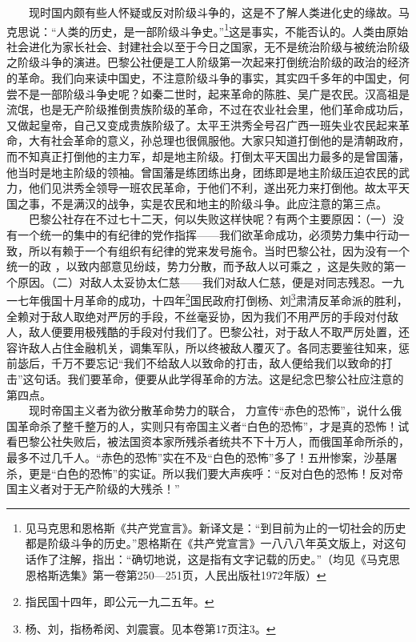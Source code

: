\documentclass[cn,11pt,chinese]{elegantbook}
\begin{document}
　　现时国内颇有些人怀疑或反对阶级斗争的，这是不了解人类进化史的缘故。马克思说：“人类的历史，是一部阶级斗争史。”\footnote[3]{见马克思和恩格斯《共产党宣言》。新译文是：“到目前为止的一切社会的历史都是阶级斗争的历史。”恩格斯在《共产党宣言》一八八八年英文版上，对这句话作了注解，指出：“确切地说，这是指有文字记载的历史。”（均见《马克思恩格斯选集》第一卷第250—251页，人民出版社1972年版）}这是事实，不能否认的。人类由原始社会进化为家长社会、封建社会以至于今日之国家，无不是统治阶级与被统治阶级之阶级斗争的演进。巴黎公社便是工人阶级第一次起来打倒统治阶级的政治的经济的革命。我们向来读中国史，不注意阶级斗争的事实，其实四千多年的中国史，何尝不是一部阶级斗争史呢？如秦二世时，起来革命的陈胜、吴广是农民。汉高祖是流氓，也是无产阶级推倒贵族阶级的革命，不过在农业社会里，他们革命成功后，又做起皇帝，自己又变成贵族阶级了。太平王洪秀全号召广西一班失业农民起来革命，大有社会革命的意义，孙总理也很佩服他。大家只知道打倒他的是清朝政府，而不知真正打倒他的主力军，却是地主阶级。打倒太平天国出力最多的是曾国藩，他当时是地主阶级的领袖。曾国藩是练团练出身，团练即是地主阶级压迫农民的武力，他们见洪秀全领导一班农民革命，于他们不利，遂出死力来打倒他。故太平天国之事，不是满汉的战争，实是农民和地主的阶级斗争。此应注意的第三点。\\
　　巴黎公社存在不过七十二天，何以失败这样快呢？有两个主要原因：（一）没有一个统一的集中的有纪律的党作指挥——我们欲革命成功，必须势力集中行动一致，所以有赖于一个有组织有纪律的党来发号施令。当时巴黎公社，因为没有一个统一的政 ，以致内部意见纷歧，势力分散，而予敌人以可乘之 ，这是失败的第一个原因。（二）对敌人太妥协太仁慈——我们对敌人仁慈，便是对同志残忍。一九一七年俄国十月革命的成功，十四年\footnote[4]{指民国十四年，即公元一九二五年。}国民政府打倒杨、刘\footnote[5]{杨、刘，指杨希闵、刘震寰。见本卷第17页注3。}肃清反革命派的胜利，全赖对于敌人取绝对严厉的手段，不丝毫妥协，因为我们不用严厉的手段对付敌人，敌人便要用极残酷的手段对付我们了。巴黎公社，对于敌人不取严厉处置，还容许敌人占住金融机关，调集军队，所以终被敌人覆灭了。各同志要鉴往知来，惩前毖后，千万不要忘记“我们不给敌人以致命的打击，敌人便给我们以致命的打击”这句话。我们要革命，便要从此学得革命的方法。这是纪念巴黎公社应注意的第四点。\\
　　现时帝国主义者为欲分散革命势力的联合， 力宣传“赤色的恐怖”，说什么俄国革命杀了整千整万的人，实则只有帝国主义者“白色的恐怖”，才是真的恐怖！试看巴黎公社失败后，被法国资本家所残杀者统共不下十万人，而俄国革命所杀的，最多不过几千人。“赤色的恐怖”实在不及“白色的恐怖”多了！五卅惨案，沙基屠杀，更是“白色的恐怖”的实证。所以我们要大声疾呼：“反对白色的恐怖！反对帝国主义者对于无产阶级的大残杀！”
\newpage
\end{document}

